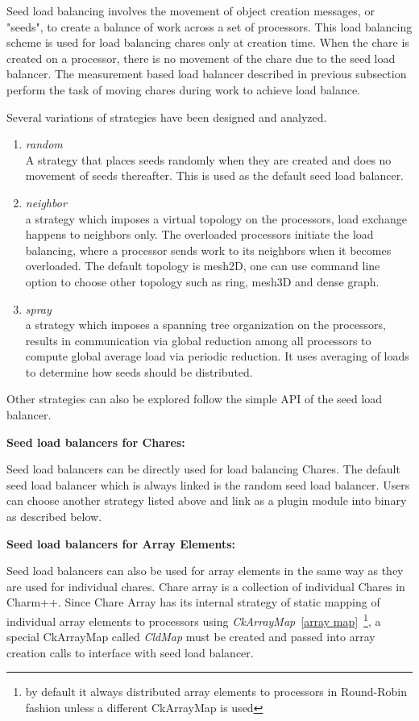 \label{seedlb}

Seed load balancing involves the movement of object creation messages, or
"seeds", to create a balance of work across a set of processors. This load
balancing scheme is used for load balancing chares only at creation time. When
the chare is created on a processor, there is no movement of the chare due to
the seed load balancer. The measurement based load balancer described in
previous subsection perform the task of moving chares during work to achieve
load balance.

Several variations of strategies have been designed and analyzed. 
\begin{enumerate}
\item {\em random}\\  
 A strategy that places seeds randomly when they are created and does
no movement of seeds thereafter. This is used as the default seed 
load balancer.
\item {\em neighbor}\\  
 a strategy which imposes a virtual topology on the processors,
 load exchange happens to neighbors only. The overloaded processors
 initiate the load balancing, where a processor sends work to its neighbors
 when it becomes overloaded. The default topology is mesh2D, one can use
 command line option to choose other topology such as ring, mesh3D and 
 dense graph.
\item {\em spray}\\  
 a strategy which imposes a spanning tree organization on the processors,
 results in communication via global reduction among all processors 
 to compute global average load via periodic reduction. 
 It uses averaging of loads to determine how seeds should be
distributed.
\end{enumerate}

Other strategies can also be explored follow the simple API of the 
seed load balancer.
\linebreak

{\bf Seed load balancers for Chares:}

Seed load balancers can be directly used for load balancing Chares.
The default seed load balancer which is always linked is the random seed load balancer.
Users can choose another strategy listed above and link as a plugin
module into binary as described below.

{\bf Seed load balancers for Array Elements:}

Seed load balancers can also be used for array elements in the same way 
as they are used for individual chares.
Chare array is a collection of individual Chares in Charm++.
Since Chare Array has its internal strategy of static mapping of individual
array elements to processors using {\em CkArrayMap}~\ref{array map}~\footnote{by default it always distributed array elements to processors in Round-Robin fashion unless a different CkArrayMap is used}, 
a special CkArrayMap called {\em CldMap} must be created and passed into
array creation calls to interface with seed load balancer.


